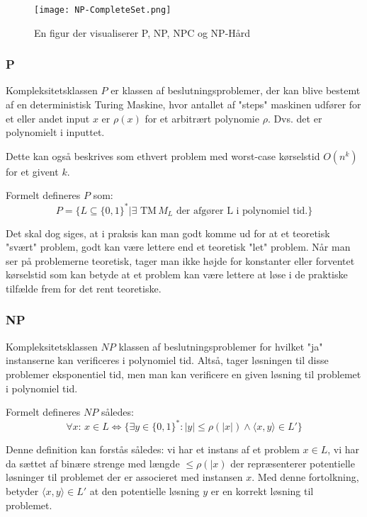 \documentclass[danish,a4paper,article,12pt]{article}
\begin{document}
\begin{figure}
\centering
\texttt{[image: NP-CompleteSet.png]}
\caption{En figur der visualiserer P, NP, NPC og NP-Hård}
\end{figure}

\subsubsection{P}
Kompleksitetsklassen $P$ er klassen af beslutningsproblemer, der kan blive bestemt af en deterministisk Turing Maskine, hvor antallet af "steps" maskinen udfører for et eller andet input $x$ er $\rho(x)$ for et arbitrært polynomie $\rho$. Dvs. det er polynomielt i inputtet. 

Dette kan også beskrives som ethvert problem med worst-case kørselstid $O(n^k)$ for et givent $k$.

Formelt defineres $P$ som:
\begin{equation}
P= \{L\subseteq \{0,1\}^* | \exists \text{ TM} \, M_L \text{ der afgører L i polynomiel tid.} \}
\end{equation}

Det skal dog siges, at i praksis kan man godt komme ud for at et teoretisk "svært" problem, godt kan være lettere end et teoretisk "let" problem. Når man ser på problemerne teoretisk, tager man ikke højde for konstanter eller forventet kørselstid som kan betyde at et problem kan være lettere at løse i de praktiske tilfælde frem for det rent teoretiske.

\subsubsection{NP}
Kompleksitetsklassen $NP$ klassen af beslutningsproblemer for hvilket "ja" instanserne kan verificeres i polynomiel tid. Altså, tager løsningen til disse problemer eksponentiel tid, men man kan verificere en given løsning til problemet i polynomiel tid.

Formelt defineres $NP$ således:
\begin{equation}
\forall x: \, x\in L \Leftrightarrow \{\exists y \in \{0,1\}^* : |y| \leq \rho(|x|) \wedge \langle x,y \rangle \in L' \}
\end{equation}

Denne definition kan forstås således: vi har et instans af et problem $x\in L$, vi har da sættet af binære strenge med længde $\leq \rho(|x)$ der repræsenterer potentielle løsninger til problemet der er associeret med instansen $x$. Med denne fortolkning, betyder $\langle x,y \rangle \in L'$ at den potentielle løsning $y$ er en korrekt løsning til problemet. 
\end{document}
